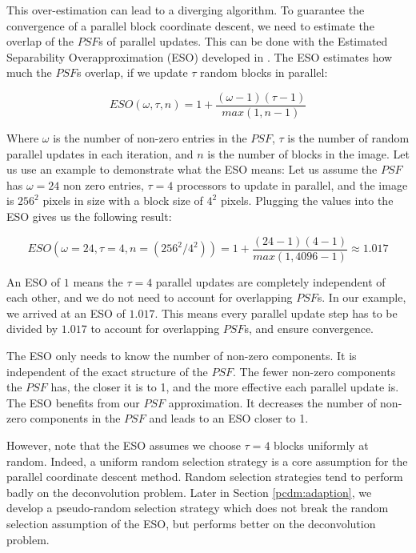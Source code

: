 This over-estimation can lead to a diverging algorithm. To guarantee the convergence of a parallel block coordinate descent, we need to estimate the overlap of the $PSF$s of parallel updates. This can be done with the Estimated Separability Overapproximation (ESO) developed in \cite{richtarik2016parallel}. The ESO estimates how much the $PSF$s overlap, if we update $\tau$ random blocks in parallel:

\begin{equation}\label{pcdm:pcdm:eso}
ESO(\omega, \tau, n) = 1+ \frac{(\omega - 1)(\tau - 1)}{max(1, n -1)}
\end{equation}

Where $\omega$ is the number of non-zero entries in the $PSF$, $\tau$ is the number of random parallel updates in each iteration, and $n$ is the number of blocks in the image. Let us use an example to demonstrate what the ESO means: Let us assume the $PSF$ has $\omega = 24$ non zero entries, $\tau = 4$ processors to update in parallel, and the image is $256^2$ pixels in size with a block size of $4^2$ pixels. Plugging the values into the ESO gives us the following result:

\begin{equation}
ESO(\omega = 24, \tau = 4, n = (256^2 / 4^2)) = 1+ \frac{(24 - 1)(4 - 1)}{max(1, 4096 -1)} \approx 1.017
\end{equation}

An ESO of $1$ means the $\tau = 4$ parallel updates are completely independent of each other, and we do not need to account for overlapping $PSF$s. In our example, we arrived at an ESO of $1.017$. This means every parallel update step has to be divided by $1.017$ to account for overlapping $PSF$s, and ensure convergence.

The ESO only needs to know the number of non-zero components. It is independent of the exact structure of the $PSF$. The fewer non-zero components the $PSF$ has, the closer it is to 1, and the more effective each parallel update is. The ESO benefits from our $PSF$ approximation. It decreases the number of non-zero components in the $PSF$ and leads to an ESO closer to 1.

However, note that the ESO assumes we choose $\tau = 4$ blocks uniformly at random. Indeed, a uniform random selection strategy is a core assumption for the parallel coordinate descent method\cite{richtarik2016parallel}. Random selection strategies tend to perform badly on the deconvolution problem. Later in Section \ref{pcdm:adaption}, we develop a pseudo-random selection strategy which does not break the random selection assumption of the ESO, but performs better on the deconvolution problem.


